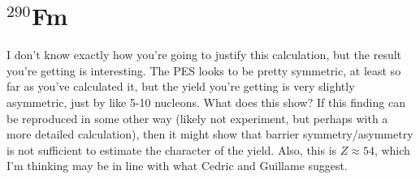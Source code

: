 \section{$^{290}$Fm}
I don't know exactly how you're going to justify this calculation, but the result you're getting is interesting. The PES looks to be pretty symmetric, at least so far as you've calculated it, but the yield you're getting is very slightly asymmetric, just by like 5-10 nucleons. What does this show? If this finding can be reproduced in some other way (likely not experiment, but perhaps with a more detailed calculation), then it might show that barrier symmetry/asymmetry is not sufficient to estimate the character of the yield. Also, this is $Z\approx54$, which I'm thinking may be in line with what Cedric and Guillame suggest.


